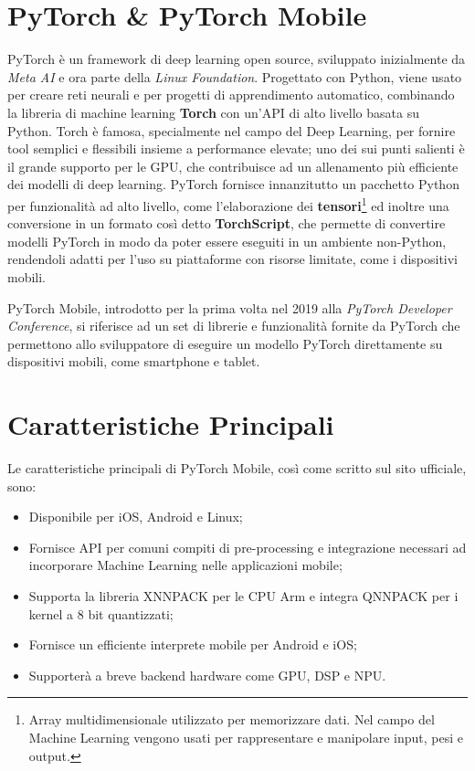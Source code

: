 \section{PyTorch \& PyTorch Mobile}
PyTorch\cite{Pytorch} è un framework di deep learning open source, sviluppato inizialmente da \textit{Meta AI} e ora parte della \textit{Linux Foundation}.
Progettato con Python, viene usato per creare reti neurali e per progetti di apprendimento automatico,
combinando la libreria di machine learning \textbf{Torch}\cite{Torch} con un’API di alto livello basata su Python. Torch è famosa, specialmente nel campo
del Deep Learning, per fornire tool semplici e flessibili insieme a performance elevate; uno dei sui punti salienti è il grande supporto per le GPU, che 
contribuisce ad un allenamento più efficiente dei modelli di deep learning.
PyTorch fornisce innanzitutto un pacchetto Python per funzionalità ad alto livello, come l'elaborazione dei \textbf{tensori}\footnote{Array multidimensionale utilizzato per memorizzare dati. Nel campo del Machine Learning vengono usati per rappresentare e manipolare input, pesi e output.}
ed inoltre una conversione in un formato così detto \textbf{TorchScript}, che permette di convertire modelli PyTorch in modo da poter essere eseguiti in un ambiente non-Python, rendendoli adatti per l'uso su piattaforme con risorse limitate,
come i dispositivi mobili.

PyTorch Mobile\cite{PyTorchMed}, introdotto per la prima volta nel 2019 alla \textit{PyTorch Developer Conference}, si riferisce ad un set di librerie e funzionalità fornite da PyTorch che
permettono allo sviluppatore di eseguire un modello PyTorch direttamente su dispositivi mobili, come smartphone e tablet.

\section{Caratteristiche Principali}
Le caratteristiche principali di PyTorch Mobile, così come scritto sul sito ufficiale\cite{PyTorchOfficial}, sono:
\begin{itemize}
    \item Disponibile per iOS, Android e Linux;
    \item Fornisce API per comuni compiti di pre-processing e integrazione necessari ad incorporare Machine Learning nelle applicazioni mobile;
    \item Supporta la libreria XNNPACK per le CPU Arm e integra QNNPACK per i kernel a 8 bit quantizzati;
    \item Fornisce un efficiente interprete mobile per Android e iOS;
    \item Supporterà a breve backend hardware come GPU, DSP e NPU.
\end{itemize}

